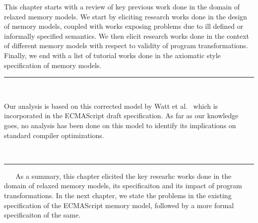 This chapter starts with a review of key previous work done in the domain of relaxed memory models.
We start by eliciting research works done in the design of memory models, coupled with works exposing problems due to ill defined or informally specified semantics. 
We then elicit research works done in the context of different memory models with respect to validity of program transformations. 
Finally, we end with a list of tutorial works done in the axiomatic style specification of memory models.
\ \newline
\ \newline  
\hrule 
\ \newline 
\ \newline 






  

   
   Our analysis is based on this corrected model by Watt et al.~\cite{WattC} which is incorporated in the ECMAScript draft specification. As far as our knowledge goes, no analysis has been done on this model to identify its implications on standard compiler optimizations. 

\ \newline
\ \newline  
\hrule 
\ \newline 
\ \newline 
As a summary, this chapter elicited the key researhc works done in the domain of relaxed memory models, its specificaiton and its impact of program transformations. 
In the next chapter, we state the problems in the existing specification of the ECMAScript memory model, followed by a more formal specificaiton of the same.